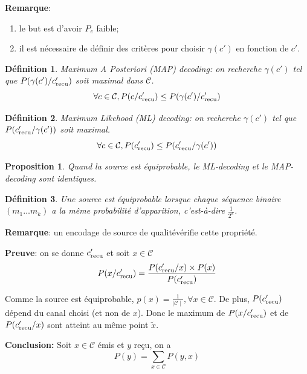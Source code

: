 \documentclass[a4paper,10pt,twocolumn]{article}
\theoremstyle{break}
\newtheorem{mydef}{Définition}
\newtheorem{myprop}{Proposition}
\newenvironment{note}[1]
{\textbf{#1}:}
{}
\newenvironment{myproof}
{\begin{note}{Preuve}}
{\end{note}}
\newenvironment{remarque}
{\begin{note}{Remarque}}
{\end{note}}
\begin{document}
\begin{remarque}
\begin{enumerate}
 \item le but est d'avoir $P_e$ faible;
 \item il est nécessaire de définir des critères pour choisir $\gamma(c')$ en fonction de $c'$.
\end{enumerate}
\end{remarque}

\begin{mydef}
 Maximum A Posteriori (MAP) decoding: on recherche $\gamma(c')$ tel que $P(\gamma(c') / c'_{\rm{recu}})$ soit maximal dans $\mathcal{C}$.
 $$ \forall c \in \mathcal{C}, P(c/c'_{\rm{recu}}) \le P(\gamma(c') / c'_{\rm{recu}}) $$
\end{mydef}

\begin{mydef}
 Maximum Likehood (ML) decoding: on recherche $\gamma(c')$ tel que $P(c'_{\rm{recu}} / \gamma(c'))$ soit maximal.
 $$ \forall c \in \mathcal{C}, P(c'_{\rm{recu}}) \le P(c'_{\rm{recu}} / \gamma(c')) $$
\end{mydef}

\begin{myprop}
 Quand la source est équiprobable, le ML-decoding et le MAP-decoding sont identiques.
\end{myprop}

\begin{mydef}
 Une source est équiprobable lorsque chaque séquence binaire $(m_1 \ldots m_k)$ a la même probabilité d'apparition, c'est-à-dire $\frac{1}{2^k}$.
\end{mydef}

\begin{remarque}
 un encodage de source de \flqq qualité\frqq vérifie cette propriété.
\end{remarque}

\begin{myproof}
 on se donne $c'_{\rm{recu}}$ et soit $x \in \mathcal{C}$
$$ P(x/c'_{\rm{recu}}) = \frac{P(c'_{\rm{recu}}/x)\times P(x)}{P(c'_{\rm{recu}})}$$

Comme la source est équiprobable, $p(x) = \frac{1}{\mid\mathcal{C}\mid}, \forall x \in \mathcal{C}$.
De plus, $P(c'_{\rm{recu}})$ dépend du canal choisi (et non de $x$).
Donc le maximum de $P(x/c'_{\rm{recu}})$ et de $P(c'_{\rm{recu}}/x)$ sont atteint au même point $\tilde{x}$.
\end{myproof}

\textbf{Conclusion:} Soit $x \in \mathcal{C}$ émis et $y$ reçu, on a
$$P(y) = \sum_{x \in \mathcal{C}} P(y,x)$$
\end{document}
